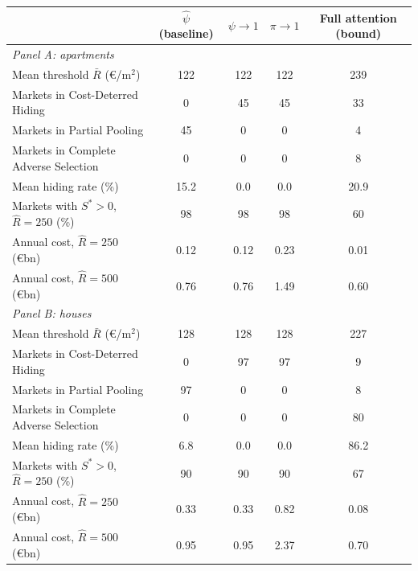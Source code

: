 \begin{tabular*}{\textwidth}{@{\extracolsep{\fill}}lcccc@{}}
\toprule\toprule
 & \textbf{$\hat\psi$ (baseline)} & \textbf{$\psi\to1$} & \textbf{$\pi\to1$} & \textbf{Full attention (bound)} \\
\midrule
\multicolumn{5}{l}{\textit{Panel A: apartments}} \\
Mean threshold $\bar R$ (\euro/m$^2$) & 122 & 122 & 122 & 239 \\
Markets in Cost-Deterred Hiding & 0 & 45 & 45 & 33 \\
Markets in Partial Pooling & 45 & 0 & 0 & 4 \\
Markets in Complete Adverse Selection & 0 & 0 & 0 & 8 \\
Mean hiding rate (\%) & 15.2 & 0.0 & 0.0 & 20.9 \\
Markets with $S^*>0$, $\hat R=250$ (\%) & 98 & 98 & 98 & 60 \\
Annual cost, $\hat R=250$ (\euro bn) & 0.12 & 0.12 & 0.23 & 0.01 \\
Annual cost, $\hat R=500$ (\euro bn) & 0.76 & 0.76 & 1.49 & 0.60 \\
\midrule
\multicolumn{5}{l}{\textit{Panel B: houses}} \\
Mean threshold $\bar R$ (\euro/m$^2$) & 128 & 128 & 128 & 227 \\
Markets in Cost-Deterred Hiding & 0 & 97 & 97 & 9 \\
Markets in Partial Pooling & 97 & 0 & 0 & 8 \\
Markets in Complete Adverse Selection & 0 & 0 & 0 & 80 \\
Mean hiding rate (\%) & 6.8 & 0.0 & 0.0 & 86.2 \\
Markets with $S^*>0$, $\hat R=250$ (\%) & 90 & 90 & 90 & 67 \\
Annual cost, $\hat R=250$ (\euro bn) & 0.33 & 0.33 & 0.82 & 0.08 \\
Annual cost, $\hat R=500$ (\euro bn) & 0.95 & 0.95 & 2.37 & 0.70 \\
\bottomrule\bottomrule
\end{tabular*}
